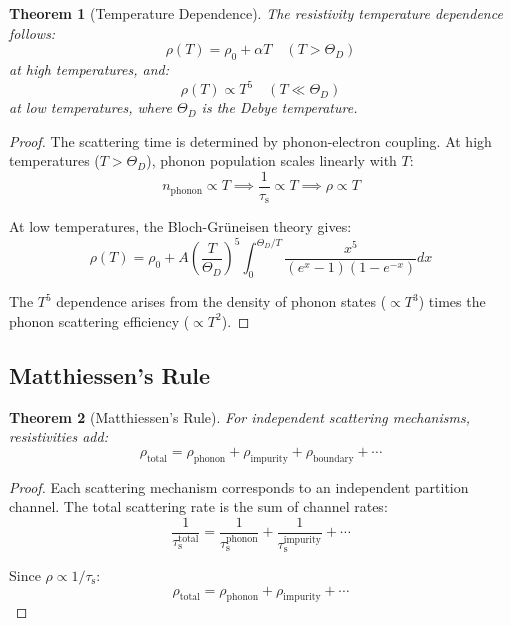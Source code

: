 \documentclass[twocolumn,10pt]{article}
\newtheorem{theorem}{Theorem}[section]
\theoremstyle{definition}
\theoremstyle{remark}
\newcommand{\taus}{\tau_{\mathrm{s}}}
\begin{document}
\begin{theorem}[Temperature Dependence]
\label{thm:temperature}
The resistivity temperature dependence follows:
\begin{equation}
\rho(T) = \rho_0 + \alpha T \quad (T > \Theta_D)
\end{equation}
at high temperatures, and:
\begin{equation}
\rho(T) \propto T^5 \quad (T \ll \Theta_D)
\end{equation}
at low temperatures, where $\Theta_D$ is the Debye temperature.
\end{theorem}

\begin{proof}
The scattering time is determined by phonon-electron coupling. At high temperatures ($T > \Theta_D$), phonon population scales linearly with $T$:
\begin{equation}
n_{\text{phonon}} \propto T \implies \frac{1}{\taus} \propto T \implies \rho \propto T
\end{equation}

At low temperatures, the Bloch-Grüneisen theory gives:
\begin{equation}
\rho(T) = \rho_0 + A\left(\frac{T}{\Theta_D}\right)^5 \int_0^{\Theta_D/T} \frac{x^5}{(e^x-1)(1-e^{-x})} dx
\end{equation}

The $T^5$ dependence arises from the density of phonon states ($\propto T^3$) times the phonon scattering efficiency ($\propto T^2$).
\end{proof}

\subsection{Matthiessen's Rule}

\begin{theorem}[Matthiessen's Rule]
\label{thm:matthiessen}
For independent scattering mechanisms, resistivities add:
\begin{equation}
\boxed{\rho_{\text{total}} = \rho_{\text{phonon}} + \rho_{\text{impurity}} + \rho_{\text{boundary}} + \cdots}
\end{equation}
\end{theorem}

\begin{proof}
Each scattering mechanism corresponds to an independent partition channel. The total scattering rate is the sum of channel rates:
\begin{equation}
\frac{1}{\taus^{\text{total}}} = \frac{1}{\taus^{\text{phonon}}} + \frac{1}{\taus^{\text{impurity}}} + \cdots
\end{equation}

Since $\rho \propto 1/\taus$:
\begin{equation}
\rho_{\text{total}} = \rho_{\text{phonon}} + \rho_{\text{impurity}} + \cdots
\end{equation}
\end{proof}
\end{document}
